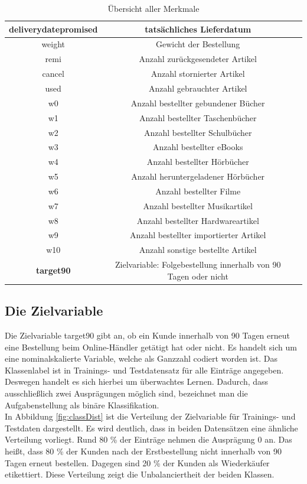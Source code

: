 \begin{table}[]
\begin{tabular*}{\textwidth}{c @{\extracolsep{\fill}} cc}
 \hline
 deliverydatepromised & tatsächliches Lieferdatum\\
 \hline
 weight & Gewicht der Bestellung\\
 \hline
 remi & Anzahl zurückgesendeter Artikel\\
 \hline
 cancel & Anzahl stornierter Artikel\\
 \hline
 used & Anzahl gebrauchter Artikel\\
 \hline
 w0 & Anzahl bestellter gebundener Bücher\\
 \hline
 w1 & Anzahl bestellter Taschenbücher\\
 \hline
 w2 & Anzahl bestellter Schulbücher\\
 \hline
 w3 & Anzahl bestellter eBooks\\
 \hline
 w4 & Anzahl bestellter Hörbücher\\
 \hline
 w5 & Anzahl heruntergeladener Hörbücher\\
 \hline
 w6 & Anzahl bestellter Filme\\
 \hline
 w7 & Anzahl bestellter Musikartikel\\
 \hline
 w8 & Anzahl bestellter Hardwareartikel\\
 \hline
 w9 & Anzahl bestellter importierter Artikel\\
 \hline
 w10 & Anzahl sonstige bestellte Artikel\\
 \hline
 \textbf{target90} & Zielvariable: Folgebestellung innerhalb von 90 Tagen oder nicht\\
\bottomrule
\end{tabular*}
\label{table: Features}
\caption{Übersicht aller Merkmale}
\end{table}
\FloatBarrier
\pagebreak

\subsection{Die Zielvariable}

Die Zielvariable target90 gibt an, ob ein Kunde innerhalb von 90 Tagen erneut eine Bestellung beim Online-Händler getätigt hat oder nicht. Es handelt sich um eine nominalskalierte Variable, welche als Ganzzahl codiert worden ist. Das Klassenlabel ist in Trainings- und Testdatensatz für alle Einträge angegeben. Deswegen handelt es sich hierbei um überwachtes Lernen. Dadurch, dass ausschließlich zwei Ausprägungen möglich sind, bezeichnet man die Aufgabenstellung als binäre Klassifikation.\\

In Abbildung \ref{fig:classDist} ist die Verteilung der Zielvariable für Trainings- und Testdaten dargestellt. Es wird deutlich, dass in beiden Datensätzen eine ähnliche Verteilung vorliegt. Rund 80 \% der Einträge nehmen die Ausprägung 0 an. Das heißt, dass 80 \% der Kunden nach der Erstbestellung nicht innerhalb von 90 Tagen erneut bestellen. Dagegen sind 20 \% der Kunden als Wiederkäufer etikettiert. Diese Verteilung zeigt die Unbalanciertheit der beiden Klassen.\\

